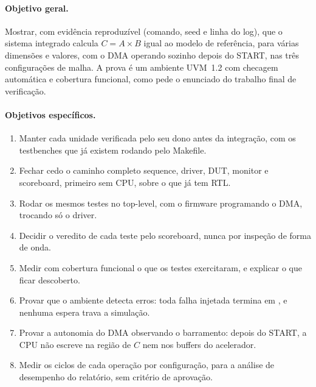 \documentclass[10pt,a4paper]{article}
\newcommand{\code}[1]{\texttt{\detokenize{#1}}}
\begin{document}
\paragraph{Objetivo geral.}
Mostrar, com evidência reproduzível (comando, seed e linha do log), que o sistema integrado calcula
$C = A \times B$ igual ao modelo de referência, para várias dimensões e valores, com o DMA operando
sozinho depois do START, nas três configurações de malha. A prova é um ambiente UVM~1.2 com
checagem automática e cobertura funcional, como pede o enunciado do trabalho final de verificação.

\paragraph{Objetivos específicos.}
\begin{enumerate}
  \item Manter cada unidade verificada pelo seu dono antes da integração, com os testbenches que já
  existem rodando pelo Makefile.
  \item Fechar cedo o caminho completo sequence, driver, DUT, monitor e scoreboard, primeiro sem
  CPU, sobre o que já tem RTL.
  \item Rodar os mesmos testes no top-level, com o firmware programando o DMA, trocando só o
  driver.
  \item Decidir o veredito de cada teste pelo scoreboard, nunca por inspeção de forma de onda.
  \item Medir com cobertura funcional o que os testes exercitaram, e explicar o que ficar
  descoberto.
  \item Provar que o ambiente detecta erros: toda falha injetada termina em \code{TEST FAIL}, e
  nenhuma espera trava a simulação.
  \item Provar a autonomia do DMA observando o barramento: depois do START, a CPU não escreve na
  região de $C$ nem nos buffers do acelerador.
  \item Medir os ciclos de cada operação por configuração, para a análise de desempenho do
  relatório, sem critério de aprovação.
\end{enumerate}
\end{document}
